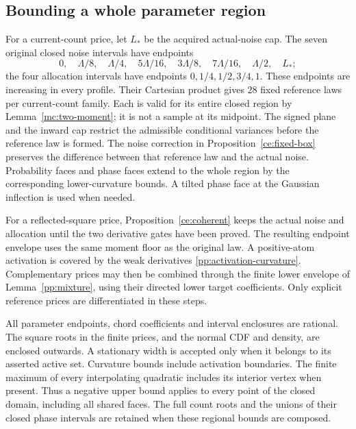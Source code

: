 \documentclass[aop,preprint]{imsart}
\theoremstyle{definition}
\numberwithin{equation}{section}
\begin{document}
\subsection{Bounding a whole parameter region}
For a current-count price, let $L_*$ be the acquired actual-noise cap.
The seven original closed noise intervals have endpoints
\[
 0,\quad\Lambda/8,\quad\Lambda/4,\quad5\Lambda/16,\quad
 3\Lambda/8,\quad7\Lambda/16,\quad\Lambda/2,\quad L_*;
\]
the four allocation intervals have endpoints $0,1/4,1/2,3/4,1$.
These endpoints are increasing in every profile.
Their Cartesian product gives $28$ fixed reference laws per
current-count family. Each is valid for its entire closed region
by Lemma~\ref{mc:two-moment}; it is not a sample at its midpoint.
The signed plane and the inward cap restrict the admissible
conditional variances before the reference law is formed.
The noise correction in Proposition~\ref{ce:fixed-box} preserves
the difference between that reference law and the actual noise.
Probability faces and phase faces extend to the whole region
by the corresponding lower-curvature bounds. A tilted phase
face at the Gaussian inflection is used when needed.

For a reflected-square price, Proposition~\ref{ce:coherent}
keeps the actual noise and allocation until the two derivative
gates have been proved. The resulting endpoint envelope uses
the same moment floor as the original law. A positive-atom
activation is covered by the weak derivatives
\eqref{pp:activation-curvature}. Complementary prices may then be
combined through the finite lower envelope of Lemma~\ref{pp:mixture},
using their directed lower target coefficients. Only explicit reference prices are
differentiated in these steps.

All parameter endpoints, chord coefficients and interval enclosures
are rational. The square roots in the finite prices, and the
normal CDF and density, are enclosed outwards. A stationary
width is accepted only when it belongs to its asserted active
set. Curvature bounds include activation boundaries. The finite
maximum of every interpolating quadratic includes its interior
vertex when present. Thus a negative upper bound applies to
every point of the closed domain, including all shared faces.
The full count roots and the unions of their closed phase
intervals are retained when these regional bounds are composed.
\end{document}
